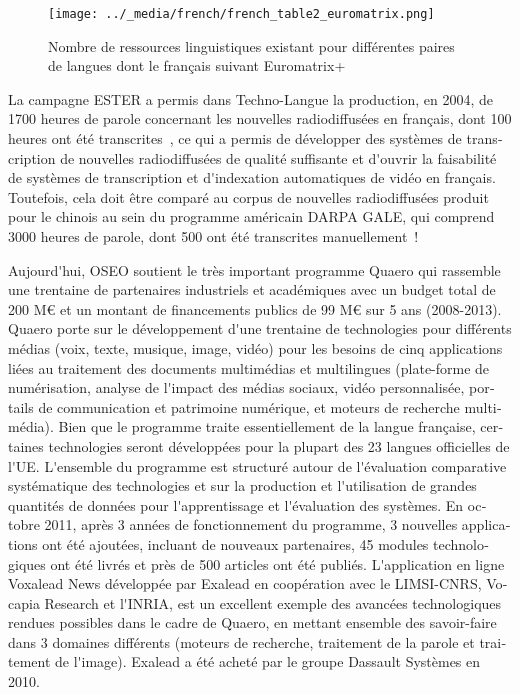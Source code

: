 \begin{french}
\begin{multicols}{2}
\begin{figure}
\begin{center}
\texttt{[image: ../\_media/french/french\_table2\_euromatrix.png]}
\caption{Nombre de ressources linguistiques existant pour différentes paires de langues dont le français suivant Euromatrix+}
\label{fig:EuromatrixFrRessource}
\end{center}
\end{figure}

La campagne ESTER a permis dans Techno-Langue la production, en 2004,
de 1700 heures de parole concernant les nouvelles radiodiffusées en
français, dont 100 heures ont été transcrites~\cite{ester}, ce qui a permis de
développer des systèmes de transcription de nouvelles radiodiffusées
de qualité suffisante et d{\mbox '}ouvrir la faisabilité de systèmes de
transcription et d{\mbox '}indexation automatiques de vidéo en
français. Toutefois, cela doit être comparé au corpus de nouvelles
radiodiffusées produit pour le chinois au sein du programme américain
DARPA GALE, qui comprend 3000 heures de parole, dont 500 ont été
transcrites manuellement~\cite{gale}!

Aujourd{\mbox '}hui, OSEO soutient le très important programme Quaero qui
rassemble une trentaine de partenaires industriels et académiques avec
un budget total de 200 M€ et un montant de financements publics de 99
M€ sur 5 ans (2008-2013). Quaero porte sur le développement d{\mbox '}une
trentaine de technologies pour différents médias (voix, texte,
musique, image, vidéo) pour les besoins de cinq applications liées au
traitement des documents multimédias et multilingues (plate-forme de
numérisation, analyse de l{\mbox '}impact des médias sociaux, vidéo
personnalisée, portails de communication et patrimoine numérique, et
moteurs de recherche multimédia). Bien que le programme traite
essentiellement de la langue française, certaines technologies seront
développées pour la plupart des 23 langues officielles de
l{\mbox '}UE. L{\mbox '}ensemble du programme est structuré autour de l{\mbox '}évaluation
comparative systématique des technologies et sur la production et
l{\mbox '}utilisation de grandes quantités de données pour l{\mbox '}apprentissage et
l{\mbox '}évaluation des systèmes. En octobre 2011, après 3 années de
fonctionnement du programme, 3 nouvelles applications ont été
ajoutées, incluant de nouveaux partenaires, 45 modules technologiques
ont été livrés et près de 500 articles ont été publiés. L{\mbox '}application
en ligne Voxalead News développée par Exalead en coopération avec le
LIMSI-CNRS, Vocapia Research et l{\mbox '}INRIA, est un excellent exemple des
avancées technologiques rendues possibles dans le cadre de Quaero, en
mettant ensemble des savoir-faire dans 3 domaines différents (moteurs
de recherche, traitement de la parole et traitement de
l{\mbox '}image). Exalead a été acheté par le groupe Dassault Systèmes en 2010.


\end{multicols}
\end{french}
